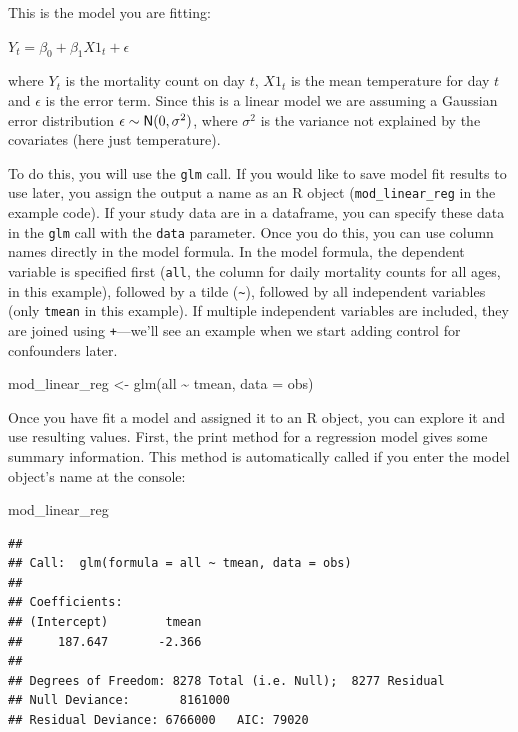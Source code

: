\documentclass[
]{book}
\newenvironment{Shaded}{\begin{snugshade}}{\end{snugshade}}
\newcommand{\AttributeTok}[1]{\textcolor[rgb]{0.77,0.63,0.00}{#1}}
\newcommand{\FunctionTok}[1]{\textcolor[rgb]{0.00,0.00,0.00}{#1}}
\newcommand{\NormalTok}[1]{#1}
\newcommand{\OtherTok}[1]{\textcolor[rgb]{0.56,0.35,0.01}{#1}}
\newcommand{\SpecialCharTok}[1]{\textcolor[rgb]{0.00,0.00,0.00}{#1}}
\begin{document}
This is the model you are fitting:

\(Y_{t}=\beta_{0}+\beta_{1}X1_{t}+\epsilon\)

where \(Y_{t}\) is the mortality count on day \(t\), \(X1_{t}\) is the mean temperature
for day \(t\) and \(\epsilon\) is the error term. Since this is a linear model we are
assuming a Gaussian error distribution \(\epsilon \sim {\sf N}(0, \sigma^{2})\),
where \(\sigma^{2}\) is the variance not explained by the covariates (here just
temperature).

To do this, you will use the \texttt{glm} call. If you would like to save model fit
results to use later, you assign the output a name as an R object
(\texttt{mod\_linear\_reg} in the example code). If your study data are in a dataframe,
you can specify these data in the \texttt{glm} call with the \texttt{data} parameter.
Once you do this, you can use column names directly in the model formula.
In the model formula, the dependent variable is specified first (\texttt{all}, the
column for daily mortality counts for all ages, in this example), followed
by a tilde (\texttt{\textasciitilde{}}), followed by all independent variables (only \texttt{tmean} in this
example). If multiple independent variables are included, they are joined using
\texttt{+}---we'll see an example when we start adding control for confounders later.

\begin{Shaded}
\begin{Highlighting}[]
\NormalTok{mod\_linear\_reg }\OtherTok{\textless{}{-}} \FunctionTok{glm}\NormalTok{(all }\SpecialCharTok{\textasciitilde{}}\NormalTok{ tmean, }\AttributeTok{data =}\NormalTok{ obs)}
\end{Highlighting}
\end{Shaded}

Once you have fit a model and assigned it to an R object, you can explore it
and use resulting values. First, the print method for a regression model
gives some summary information. This method is automatically called if you
enter the model object's name at the console:

\begin{Shaded}
\begin{Highlighting}[]
\NormalTok{mod\_linear\_reg}
\end{Highlighting}
\end{Shaded}

\begin{verbatim}
## 
## Call:  glm(formula = all ~ tmean, data = obs)
## 
## Coefficients:
## (Intercept)        tmean  
##     187.647       -2.366  
## 
## Degrees of Freedom: 8278 Total (i.e. Null);  8277 Residual
## Null Deviance:       8161000 
## Residual Deviance: 6766000   AIC: 79020
\end{verbatim}
\end{document}
